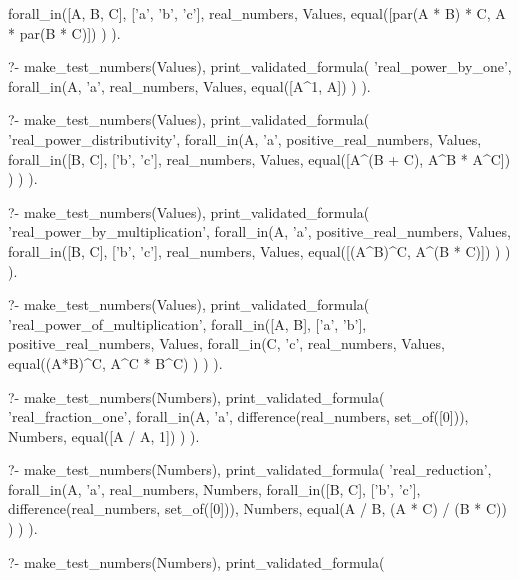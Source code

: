 \begin{fact}
\begin{prolog}
		forall_in([A, B, C], ['a', 'b', 'c'], real_numbers, Values,
			equal([par(A * B) * C, A * par(B * C)])
		)
	).				
\end{prolog}
\begin{prolog}
?-	make_test_numbers(Values),
	print_validated_formula(
		'real_power_by_one',
		forall_in(A, 'a', real_numbers, Values,
			equal([A^1, A])
		)
	).				
\end{prolog}
\begin{prolog}
?-	make_test_numbers(Values),
	print_validated_formula(
		'real_power_distributivity',
		forall_in(A, 'a', positive_real_numbers, Values,
			forall_in([B, C], ['b', 'c'], real_numbers, Values,
				equal([A^(B + C), A^B * A^C])
			)
		)
	).				
\end{prolog}
\begin{prolog}
?-	make_test_numbers(Values),
	print_validated_formula(
		'real_power_by_multiplication',
		forall_in(A, 'a', positive_real_numbers, Values,
			forall_in([B, C], ['b', 'c'], real_numbers, Values,
				equal([(A^B)^C, A^(B * C)])
			)
		)
	).
\end{prolog}
\begin{prolog}
?-	make_test_numbers(Values),
	print_validated_formula(
		'real_power_of_multiplication',
		forall_in([A, B], ['a', 'b'], positive_real_numbers, Values,
			forall_in(C, 'c', real_numbers, Values,
				equal((A*B)^C, A^C * B^C)
			)
		)
	).
\end{prolog}
\begin{prolog}
?-	make_test_numbers(Numbers),
	print_validated_formula(
		'real_fraction_one',
		forall_in(A, 'a', difference(real_numbers, set_of([0])), Numbers,
			equal([A / A, 1])
		)
	).
\end{prolog}
\begin{prolog}
?-	make_test_numbers(Numbers),
	print_validated_formula(
		'real_reduction',
		forall_in(A, 'a', real_numbers, Numbers,
			forall_in([B, C], ['b', 'c'], difference(real_numbers, set_of([0])), Numbers,
				equal(A / B, (A * C) / (B * C))
			)
		)
	).
\end{prolog}
\begin{prolog}
?-	make_test_numbers(Numbers),
	print_validated_formula(

\end{prolog}
\end{fact}
